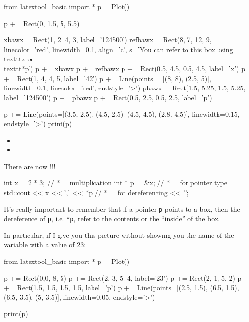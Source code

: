 \begin{python}
from latextool_basic import *
p = Plot()

p += Rect(0, 1.5, 5, 5.5)

xbawx = Rect(1, 2, 4, 3, label='124500')
refbawx = Rect(8, 7, 12, 9, linecolor='red', linewidth=0.1, align='c', s='You can refer to this box using \\texttt{x} or \\texttt{*p}')
p += xbawx
p += refbawx
p += Rect(0.5, 4.5, 0.5, 4.5, label='x')
p += Rect(1, 4, 4, 5, label='42')
p += Line(points = [(8, 8), (2.5, 5)], linewidth=0.1, linecolor='red', endstyle='>')
pbawx = Rect(1.5, 5.25, 1.5, 5.25, label='124500')
p += pbawx
p += Rect(0.5, 2.5, 0.5, 2.5, label='p')

p += Line(points=[(3.5, 2.5), (4.5, 2.5), (4.5, 4.5), (2.8, 4.5)], linewidth=0.15, endstyle='>')
print(p)
\end{python}



\begin{itemize}
\item
\item
\end{itemize}


There are now !!!

\begin{consolethree}[escapeinside=||]
int x = 2 * 3;           // * = multiplication
int * p = &x;            // * = for pointer type
std::cout << x
          << ',' << *p   // * = for dereferencing
          << '\n';
\end{consolethree}
It's really important to remember that if a pointer \texttt{p} points to a box, then the dereference of \texttt{p}, i.e. \texttt{*p}, refer to the contents or the ``inside'' of the box.

In particular, if I give you this picture without showing you the name of the variable with a value of 23:

\begin{python}
from latextool_basic import *
p = Plot()

p += Rect(0,0, 8, 5)
p += Rect(2, 3, 5, 4, label='23')
p += Rect(2, 1, 5, 2)
p += Rect(1.5, 1.5, 1.5, 1.5, label='p')
p += Line(points=[(2.5, 1.5), (6.5, 1.5), (6.5, 3.5), (5, 3.5)], linewidth=0.05, endstyle='>')

print(p)
\end{python}

